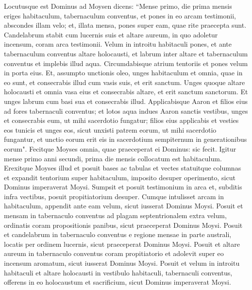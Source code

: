 \begin{biblechapter}  
\verse Locutusque est Dominus ad Moysen dicens: 
\verse “Mense primo, die prima mensis eriges habitaculum, tabernaculum conventus, 
\verse et pones in eo arcam testimonii, abscondes illam velo; 
\verse et, illata mensa, pones super eam, quae rite praecepta sunt. Candelabrum stabit cum lucernis suis 
\verse et altare aureum, in quo adoletur incensum, coram arca testimonii. Velum in introitu habitaculi pones, 
\verse et ante tabernaculum conventus altare holocausti, 
\verse et labrum inter altare et tabernaculum conventus et implebis illud aqua. 
\verse Circumdabisque atrium tentoriis et pones velum in porta eius. 
\verse Et, assumpto unctionis oleo, unges habitaculum et omnia, quae in eo sunt, et consecrabis illud cum vasis suis, et erit sanctum. 
\verse Unges quoque altare holocausti et omnia vasa eius et consecrabis altare, et erit sanctum sanctorum. 
\verse Et unges labrum cum basi sua et consecrabis illud. 
\verse Applicabisque Aaron et filios eius ad fores tabernaculi conventus; et lotos aqua 
\verse indues Aaron sanctis vestibus, unges et consecrabis eum, ut mihi sacerdotio fungatur; 
\verse filios eius applicabis et vesties eos tunicis 
\verse et unges eos, sicut unxisti patrem eorum, ut mihi sacerdotio fungantur, et unctio eorum erit eis in sacerdotium sempiternum in generationibus eorum".  
\verse Fecitque Moyses omnia, quae praeceperat ei Dominus: sic fecit. 
\verse Igitur mense primo anni secundi, prima die mensis collocatum est habitaculum. 
\verse Erexitque Moyses illud et posuit bases ac tabulas et vectes statuitque columnas 
\verse et expandit tentorium super habitaculum, imposito desuper operimento, sicut Dominus imperaverat Moysi. 
\verse Sumpsit et posuit testimonium in arca et, subditis infra vectibus, posuit propitiatorium desuper.  
\verse Cumque intulisset arcam in habitaculum, appendit ante eam velum, sicut iusserat Dominus Moysi. 
\verse Posuit et mensam in tabernaculo conventus ad plagam septentrionalem extra velum, 
\verse ordinatis coram propositionis panibus, sicut praeceperat Dominus Moysi. 
\verse Posuit et candelabrum in tabernaculo conventus e regione mensae in parte australi, 
\verse locatis per ordinem lucernis, sicut praeceperat Dominus Moysi. 
\verse Posuit et altare aureum in tabernaculo conventus coram propitiatorio 
\verse et adolevit super eo incensum aromatum, sicut iusserat Dominus Moysi.  
\verse Posuit et velum in introitu habitaculi 
\verse et altare holocausti in vestibulo habitaculi, tabernaculi conventus, offerens in eo holocaustum et sacrificium, sicut Dominus imperaverat Moysi. 

\end{biblechapter}
